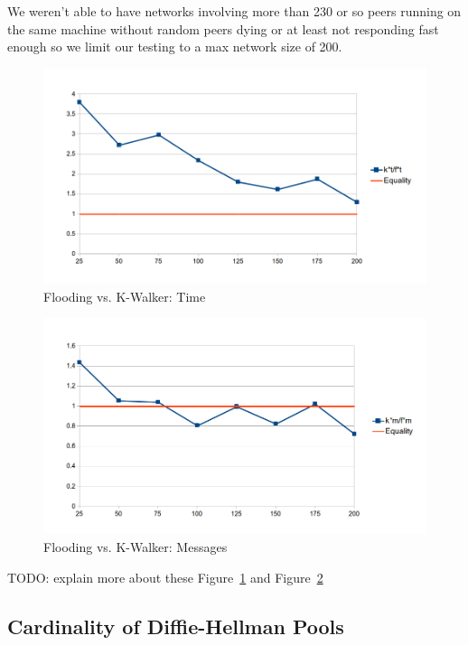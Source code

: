 We weren't able to have networks involving more than 230 or so peers running on the same machine without random peers dying or at least not responding fast enough so we limit our testing to a max network size of 200.

\begin{figure}
\caption{Flooding vs. K-Walker: Time}
\label{graph_fvsk_t}
\includegraphics[width=\textwidth]{../Grapes/flooding_vs_kwalker_time_graph.png}
\end{figure}

\begin{figure}
\caption{Flooding vs. K-Walker: Messages}
\label{graph_fvsk_m}
\includegraphics[width=\textwidth]{../Grapes/flooding_vs_kwalker_messages_graph.png}
\end{figure}

TODO: explain more about these Figure~\ref{graph_fvsk_t} and Figure~\ref{graph_fvsk_m}

\subsection{Cardinality of Diffie-Hellman Pools}

